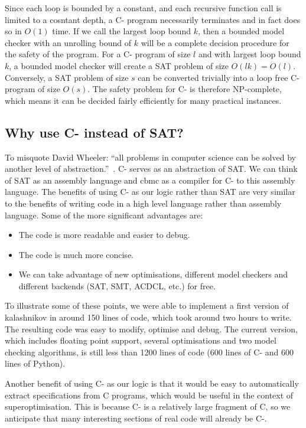\documentclass[a4paper]{llncs}
\begin{document}
Since each loop is bounded by a constant, and each recursive function call is
limited to a cosntant depth, a C- program necessarily terminates and in
fact does so in $O(1)$ time.  If we call the largest loop bound $k$, then
a bounded model checker with an unrolling bound of $k$ will be a complete
decision procedure for the safety of the program.  For a C- program of
size $l$ and with largest loop bound $k$, a bounded model checker will
create a SAT problem of size $O(lk) = O(l)$.  Conversely, a SAT problem
of size $s$ can be converted trivially into a loop free C- program
of size $O(s)$.  The safety problem for C- is therefore NP-complete,
which means it can be decided fairly efficiently for many practical
instances.

\subsection{Why use C- instead of SAT?}
To misquote David Wheeler: ``all problems in computer science can be solved by
another level of abstraction.''~\cite{beautiful-code}.  C- serves as
an abstraction of SAT.  We can think of SAT as an assembly language and
{\sc cbmc} as a compiler for C- to this assembly language.  The benefits
of using C- as our logic rather than SAT are very similar to the benefits of
writing code in a high level language rather than assembly language.
Some of the more significant advantages are:

\begin{itemize}
 \item The code is more readable and easier to debug.
 \item The code is much more concise.
 \item We can take advantage of new optimisations, different model
 checkers and different backends (SAT, SMT, ACDCL, etc.) for free.
\end{itemize}

To illustrate some of these points, we were able to implement a first
version of {\sc kalashnikov} in around 150 lines of code, which took
around two hours to write.  The resulting code was easy to modify,
optimise and debug.  The current version, which includes floating point
support, several optimisations and two model checking algorithms,
is still less than 1200 lines of code (600 lines of C- and 600 lines
of Python).

Another benefit of using C- as our logic is that it would be easy to
automatically extract specifications from C programs, which would be
useful in the context of superoptimisation.  This is because C- is
a relatively large fragment of C, so we anticipate that many interesting
sections of real code will already be C-.
\end{document}
